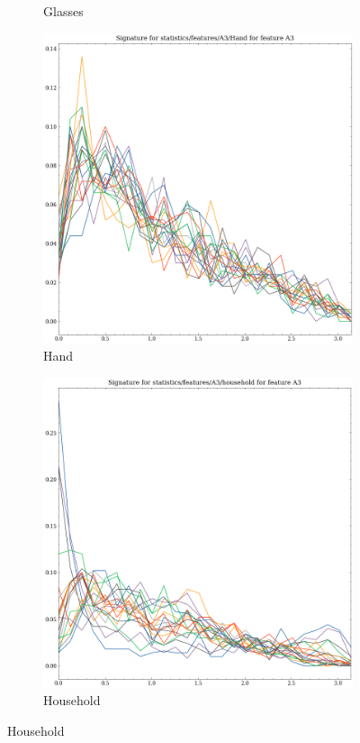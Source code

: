 \begin{figure}[ht]
\begin{subfigure}[b]{0.23\textwidth}
        \caption{Glasses}
        \label{fig:features-statistics-A3-n}    
    \end{subfigure}
    \hfill
    \begin{subfigure}[b]{0.23\textwidth}
        \includegraphics[width=\textwidth]{assets/feature_extraction/A3/Hand.png}
        \caption{Hand}
        \label{fig:features-statistics-A3-o}    
    \end{subfigure}
    \hfill
    \begin{subfigure}[b]{0.23\textwidth}
        \includegraphics[width=\textwidth]{assets/feature_extraction/A3/household.png}
        \caption{Household}
        \label{fig:features-statistics-A3-p}    
    \end{subfigure}
    \hfill


\end{figure}
